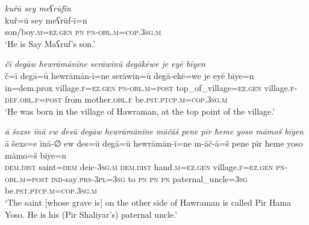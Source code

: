 \ea \label{ZP.2}
\textit{kuřū sey meʕrūfīn} \\ 
\gll kuř=ū sey meʕrūf-ī=n \\ 
 son/boy\textsc{.m}\textsc{\textsc{=ez.gen}} \textsc{pn} \textsc{pn}\textsc{-obl}\textsc{.m}\textsc{=cop}\textsc{.3sg}\textsc{.m} \\ 
\glt `He is Say Maʕruf’s son.'
\z 
 
\ea \label{ZP.3}
\textit{čī degāw hewrāmānīne serāwinū degākēwe je eyē bīyen} \\ 
\gll č=ī degā=ū hewrāmān-ī=ne serāwin=ū degā-ekē=we je eyē bīye=n \\ 
 in=dem.prox village\textsc{.f}\textsc{\textsc{=ez.gen}} \textsc{pn}\textsc{-obl}\textsc{.m}\textsc{=\textsc{post}} top\_of\_village\textsc{\textsc{=ez.gen}} village\textsc{.f}\textsc{-def}\textsc{.obl}\textsc{.f}\textsc{=\textsc{post}} from mother\textsc{.obl}\textsc{.f} be\textsc{.pst}\textsc{.ptcp}\textsc{.m}\textsc{=cop}\textsc{.3sg}\textsc{.m} \\ 
\glt `He was born in the village of Hawraman, at the top point of the village.'
\z 
 
\ea \label{ZP.6}
\textit{ā šexse īnā ew desū degāw hewrāmānīne māčāš pene pīr ħeme yoso māmoš bīyen} \\ 
\gll ā šexs=e īnā-∅ ew des=ū degā=ū hewrāmān-ī=ne m-āč-ā=š pene pīr ħeme yoso māmo=š bīye=n \\ 
 \textsc{dem.dist} saint\textsc{=dem} deic\textsc{-3sg}\textsc{.m} \textsc{dem.dist} hand\textsc{.m}\textsc{\textsc{=ez.gen}} village\textsc{.f}\textsc{\textsc{=ez.gen}} \textsc{pn}\textsc{-obl}\textsc{.m}\textsc{=\textsc{post}} \textsc{ind-}say\textsc{.prs}\textsc{-3pl}\textsc{=3sg} to \textsc{pn} \textsc{pn} \textsc{pn} paternal\_uncle\textsc{=3sg} be\textsc{.pst}\textsc{.ptcp}\textsc{.m}\textsc{=cop}\textsc{.3sg}\textsc{.m} \\ 
\glt `The saint [whose grave is] on the other side of Hawraman is called Pir Hama Yoso. He is his (Pir Shaliyar’s) paternal uncle.'
\z 
 

